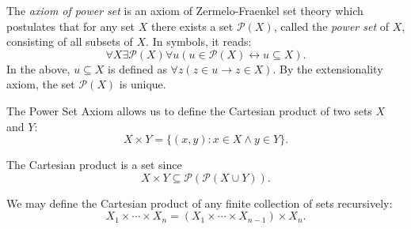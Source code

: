 \documentclass[12pt]{article}
\begin{document}
The \emph{axiom of power set} is an axiom of Zermelo-Fraenkel set theory which postulates that for any set $X$ there exists a set $\mathcal{P}(X)$, called the \emph{power set} of $X$, consisting of all subsets of $X$.  In symbols, it reads:
\[
\forall X \exists \mathcal{P}(X) \forall u (u \in \mathcal{P}(X) \leftrightarrow u \subseteq X).
\]
In the above, $u \subseteq X$ is defined as $\forall z(z \in u \rightarrow z \in X)$.  By the extensionality axiom, the set $\mathcal{P}(X)$ is unique.

The Power Set Axiom allows us to define the Cartesian product of two sets $X$ and $Y$:
\[
X \times Y = \{ (x, y) : x \in X \land y \in Y \}.
\]

The Cartesian product is a set since
\[
X \times Y \subseteq \mathcal{P}(\mathcal{P}(X \cup Y)).
\]

We may define the Cartesian product of any finite collection of sets recursively:
\[
X_1 \times \cdots \times X_n = (X_1 \times \cdots \times X_{n-1}) \times X_n.
\]
\end{document}
